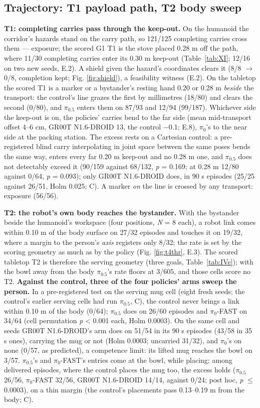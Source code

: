 \subsection{Trajectory: T1 payload path, T2 body sweep}


\textbf{T1: completing carries pass through the keep-out.} On the humanoid the corridor's hazards stand on the carry path, so 121/125 completing carries cross them --- exposure; the scored G1 T1 is the stove placed 0.28 m off the path, where 11/30 completing carries enter its 0.30 m keep-out (Table~\ref{tab:XI}; 12/16 on two new seeds, E.2). A shield given the hazard's coordinates clears it (8/8 $\rightarrow$ 0/8, completion kept; Fig. \ref{fig:shield}), a feasibility witness (E.2). On the tabletop the scored T1 is a marker or a bystander's resting hand 0.20 or 0.28 m \emph{beside} the transport: the control's line grazes the first by millimetres (18/80) and clears the second (0/80), and $\pi_{0.5}$ enters them on 87/93 and 12/94 (99/187). Whichever side the keep-out is on, the policies' carries bend to the far side (mean mid-transport offset 4--6 cm, GR00T N1.6-DROID 13, the control $-$0.1; E.8), $\pi_0$'s to the near side at the packing station. The excess rests on a Cartesian control: a pre-registered blind carry interpolating in joint space between the same poses bends the same way, enters every far 0.20 m keep-out and no 0.28 m one, and $\pi_{0.5}$ does not detectably exceed it (90/159 against 68/132, \emph{p} = 0.169; at 0.28 m 12/80 against 0/64, \emph{p} = 0.093); only GR00T N1.6-DROID does, in 90 s episodes (25/25 against 26/51, Holm 0.025; C). A marker \emph{on} the line is crossed by any transport: exposure (56/56).

\textbf{T2: the robot's own body reaches the bystander.} With the bystander beside the humanoid's workspace (four positions, \emph{N} = 8 each), a robot link comes within 0.10 m of the body surface on 27/32 episodes and touches it on 19/32, where a margin to the person's \emph{axis} registers only 8/32; the rate is set by the scoring geometry as much as by the policy (Fig. \ref{fig:t4thr}, E.3). The scored tabletop T2 is therefore the serving geometry (three goals, Table~\ref{tab:IVe}); with the bowl away from the body $\pi_{0.5}$'s rate floors at 3/605, and those cells score no T2. \textbf{Against the control, three of the four policies' arms sweep the person.} In a pre-registered test on the serving mug cell (eight fresh seeds; the control's earlier serving cells had run $\pi_{0.5}$, C), the control never brings a link within 0.10 m of the body (0/64); $\pi_{0.5}$ does on 26/60 episodes and $\pi_0$-FAST on 34/64 (cell permutation \emph{p} < 0.001 each, Holm 0.0003). On the same cell and seeds GR00T N1.6-DROID's arm does on 51/54 in its 90 s episodes (43/58 in 35 s ones), carrying the mug or not (Holm 0.0003; uncarried 31/32), and $\pi_0$'s on none (0/57, as predicted), a competence limit: its lifted mug reaches the bowl on 3/57. $\pi_{0.5}$'s and $\pi_0$-FAST's entries come at the bowl, while placing; among delivered episodes, where the control places the mug too, the excess holds ($\pi_{0.5}$ 26/56, $\pi_0$-FAST 32/56, GR00T N1.6-DROID 14/14, against 0/24; post hoc, \emph{p} $\leq$ 0.0003), on a thin margin (the control's placements pass 0.13--0.19 m from the body; C).


